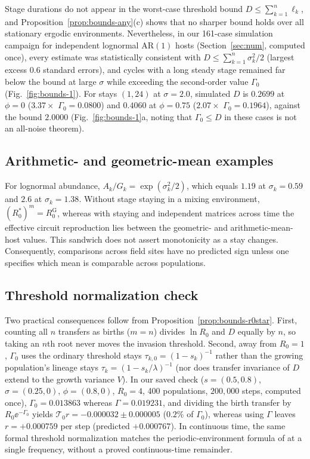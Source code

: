 Stage durations do not appear in the worst-case threshold bound $D \le \sum_{k=1}^n \ell_k$, and Proposition~\ref{prop:bounds-any}(c) shows that no sharper bound holds over all stationary ergodic environments. Nevertheless, in our 161-case simulation campaign for independent lognormal $\mathrm{AR}(1)$ hosts (Section~\ref{sec:num}, computed once), every estimate was statistically consistent with $D \le \sum_{k=1}^n \sigma_k^2/2$ (largest excess $0.6$ standard errors), and cycles with a long steady stage remained far below the bound at large $\sigma$ while exceeding the second-order value $\Gamma_0$ (Fig.~\ref{fig:bounds-1}). For stays $(1, 24)$ at $\sigma = 2.0$, simulated $D$ is $0.2699$ at $\phi = 0$ ($3.37\times$ $\Gamma_0 = 0.0800$) and $0.4060$ at $\phi = 0.75$ ($2.07\times$ $\Gamma_0 = 0.1964$), against the bound $2.0000$ (Fig.~\ref{fig:bounds-1}a, noting that $\Gamma_0 \le D$ in these cases is not an all-noise theorem).

\subsection{Arithmetic- and geometric-mean examples}\label{esm:bounds-means-example}

For lognormal abundance, $A_k / G_k = \exp(\sigma_k^2/2)$, which equals $1.19$ at $\sigma_k = 0.59$ and $2.6$ at $\sigma_k = 1.38$. Without stage staying in a mixing environment, $(R_0^*)^m = R_0^{\mathrm{G}}$, whereas with staying and independent matrices across time the effective circuit reproduction lies between the geometric- and arithmetic-mean-host values. This sandwich does not assert monotonicity as a stay changes. Consequently, comparisons across field sites have no predicted sign unless one specifies which mean is comparable across populations.

\subsection{Threshold normalization check}\label{esm:bounds-threshold-check}

Two practical consequences follow from Proposition~\ref{prop:bounds-r0star}. First, counting all $n$ transfers as births ($m = n$) divides $\ln R_0$ and $D$ equally by $n$, so taking an $n$th root never moves the invasion threshold. Second, away from $R_0 = 1$, $\Gamma_0$ uses the ordinary threshold stays $\tau_{k,0} = (1 - s_k)^{-1}$ rather than the growing population's lineage stays $\tau_k = (1 - s_k/\lambda)^{-1}$ (nor does transfer invariance of $D$ extend to the growth variance $V$). In our saved check ($s = (0.5, 0.8)$, $\sigma = (0.25, 0)$, $\phi = (0.8, 0)$, $R_0 = 4$, 400 populations, $200{,}000$ steps, computed once), $\Gamma_0 = 0.013863$ whereas $\Gamma = 0.019231$, and dividing the birth transfer by $R_0\ee^{-\Gamma_0}$ yields $\mathcal{T}_0 r = -0.000032 \pm 0.000005$ ($0.2\%$ of $\Gamma_0$), whereas using $\Gamma$ leaves $r = +0.000759$ per step (predicted $+0.000767$). In continuous time, the same formal threshold normalization matches the periodic-environment formula of \citet{bacaer2007} at a single frequency, without a proved continuous-time remainder.

